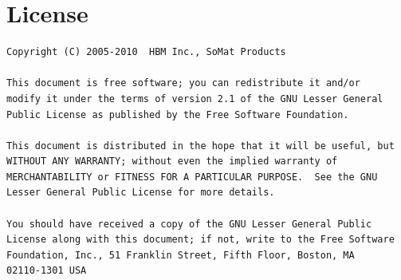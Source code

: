 \documentclass{article}
\begin{document}






\appendix

\section{License}

\begin{verbatim}
Copyright (C) 2005-2010  HBM Inc., SoMat Products

This document is free software; you can redistribute it and/or
modify it under the terms of version 2.1 of the GNU Lesser General
Public License as published by the Free Software Foundation.

This document is distributed in the hope that it will be useful, but
WITHOUT ANY WARRANTY; without even the implied warranty of
MERCHANTABILITY or FITNESS FOR A PARTICULAR PURPOSE.  See the GNU
Lesser General Public License for more details.

You should have received a copy of the GNU Lesser General Public
License along with this document; if not, write to the Free Software
Foundation, Inc., 51 Franklin Street, Fifth Floor, Boston, MA
02110-1301 USA
\end{verbatim}

{}

\end{document}
